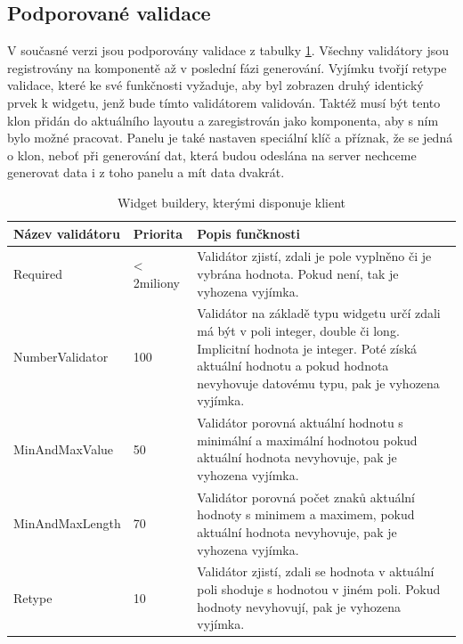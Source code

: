 \subsection{Podporované validace}
V současné verzi jsou podporovány validace z tabulky \ref{table:validations}. Všechny validátory jsou registrovány na komponentě až v poslední fázi generování. Vyjímku tvořjí retype validace, které ke své funkčnosti vyžaduje, aby byl zobrazen druhý identický prvek k widgetu, jenž bude tímto validátorem validován. Taktéž musí být tento klon přidán do aktuálního layoutu a zaregistrován jako komponenta, aby s ním bylo možné pracovat. Panelu je také nastaven speciální klíč a příznak, že se jedná o klon, neboť při generování dat, která budou odeslána na server nechceme generovat data i z toho panelu a mít data dvakrát.
\begin{table}[width=\linewidth]
\begin{center}
\caption{Widget buildery, kterými disponuje klient}
\label{table:validations}
\begin{tabular}{|p{4cm}|p{2cm}|p{8cm}|}
\hline
\textbf{Název validátoru} & \textbf{Priorita}  & \textbf{Popis funčknosti} \\
\hline
Required & < 2miliony & 
Validátor zjistí, zdali je pole vyplněno či je vybrána hodnota. Pokud není, tak je vyhozena vyjímka.\\
\hline
NumberValidator & 100 &
Validátor na základě typu widgetu určí zdali má být v poli integer, double či long. Implicitní hodnota je integer. Poté získá aktuální hodnotu a pokud hodnota nevyhovuje datovému typu, pak je vyhozena vyjímka.\\
\hline
MinAndMaxValue & 50 &
Validátor porovná aktuální hodnotu s minimální a maximální hodnotou pokud aktuální hodnota nevyhovuje, pak je vyhozena vyjímka.\\
\hline
MinAndMaxLength & 70 &
Validátor porovná počet znaků aktuální hodnoty s minimem a maximem, pokud aktuální hodnota nevyhovuje, pak je vyhozena vyjímka.\\
\hline
Retype & 10 &
Validátor zjistí, zdali se hodnota v aktuální poli shoduje s hodnotou v jiném poli. Pokud hodnoty nevyhovují, pak je vyhozena vyjímka.\\
\hline
\end{tabular}
\end{center}
\end{table}

